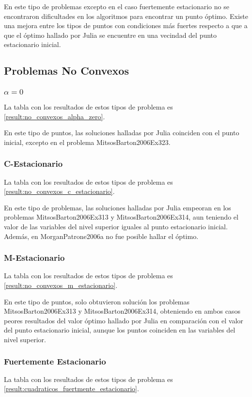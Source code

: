 En este tipo de problemas excepto en el caso fuertemente estacionario no se encontraron dificultades en los algoritmos para encontrar un punto óptimo. Existe una mejora entre los tipos de puntos con condiciones más fuertes respecto a que a que el óptimo hallado por Julia se encuentre en una vecindad del punto estacionario inicial. 

\subsection{Problemas No Convexos}


\subsubsection{$\alpha =0$}
La tabla con los resultados de estos tipos de problema es \ref{result:no_convexos_alpha_zero}.

 En este tipo de puntos, las soluciones halladas por Julia coinciden con el punto inicial, excepto en el problema MitsosBarton2006Ex323.
    
\subsubsection{C-Estacionario}
La tabla con los resultados de estos tipos de problema es \ref{result:no_convexos_c_estacionario}.

 En este tipo de problemas, las soluciones halladas por Julia empeoran en los problemas MitsosBarton2006Ex313 y MitsosBarton2006Ex314, aun teniendo el valor de las variables del nivel superior iguales al punto estacionario inicial. Además, en MorganPatrone2006a no fue posible hallar el óptimo.
\subsubsection{M-Estacionario}
La tabla con los resultados de estos tipos de problema es \ref{result:no_convexos_m_estacionario}.  

 En este tipo de puntos, solo obtuvieron solución los problemas MitsosBarton2006Ex313 y MitsosBarton2006Ex314, obteniendo en ambos casos peores resultados del valor óptimo hallado por Julia en comparación con el valor del punto estacionario inicial, aunque los puntos coinciden en las variables del nivel superior.
    
\subsubsection{Fuertemente Estacionario}
La tabla con los resultados de estos tipos de problema es \ref{result:cuadraticos_fuertmente_estacionario}.


